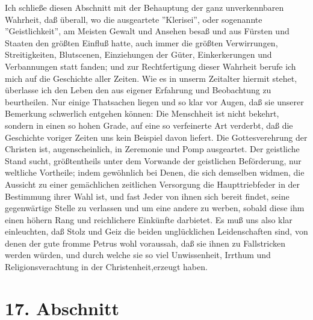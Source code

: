 \medskip

Ich schließe diesen Abschnitt mit der Behauptung der ganz unverkennbaren
Wahrheit, daß überall, wo die ausgeartete ''Klerisei'', oder sogenannte
''Geistlichkeit'', am Meisten Gewalt und Ansehen besaß und aus Fürsten und
Staaten den größten Einfluß hatte, auch immer die größten Verwirrungen,
Streitigkeiten, Blutscenen, Einziehungen der Güter, Einkerkerungen und
Verbannungen statt fanden; und zur Rechtfertigung dieser Wahrheit berufe ich
mich auf die Geschichte aller Zeiten. Wie es in unserm Zeitalter hiermit stehet,
überlasse ich den Leben den aus eigener Erfahrung und Beobachtung zu
beurtheilen. Nur einige Thatsachen liegen und so klar vor Augen, daß sie unserer
Bemerkung schwerlich entgehen können: Die Menschheit ist nicht bekehrt, sondern
in einen so hohen Grade, auf eine so verfeinerte Art verderbt, daß die
Geschichte voriger Zeiten uns kein Beispiel davon liefert. Die Gottesverehrung
der Christen ist, augenscheinlich, in Zeremonie und Pomp ausgeartet. Der
geistliche Stand sucht, größtentheils unter dem Vorwande der geistlichen
Beförderung, nur weltliche Vortheile; indem gewöhnlich bei Denen, die sich
demselben widmen, die Aussicht zu einer gemächlichen zeitlichen Versorgung die
Haupttriebfeder in der Bestimmung ihrer Wahl ist, und fast Jeder von ihnen sich
bereit findet, seine gegenwärtige Stelle zu verlassen und um eine andere zu
werben, sobald diese ihm einen höhern Rang und reichlichere Einkünfte darbietet.
Es muß uns also klar einleuchten, daß Stolz und Geiz die beiden unglücklichen
Leidenschaften sind, von denen der gute fromme Petrus wohl voraussah, daß sie
ihnen zu Fallstricken werden würden, und durch welche sie so viel Unwissenheit,
Irrthum und Religionsverachtung in der Christenheit,erzeugt haben.

\section{17. Abschnitt} \label{kap7_ab17}

